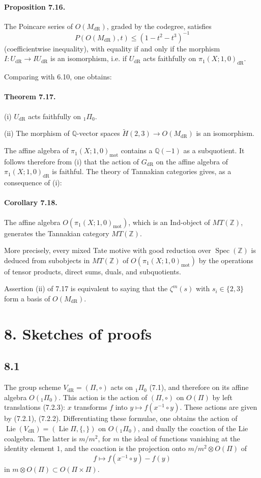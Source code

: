 \documentclass[11pt]{article}
\newcommand{\Q}{\mathbb Q}
\newcommand{\Z}{\mathbb Z}
\newcommand{\Spec}{\operatorname{Spec}}
\newcommand{\Lie}{\operatorname{Lie}}
\newcommand{\dR}{\mathrm{dR}}
\newcommand{\mot}{\mathrm{mot}}
\begin{document}
\paragraph{Proposition 7.16.}
The Poincare series of $O(M_{\dR})$, graded by the codegree, satisfies
\begin{equation}
 P(O(M_{\dR}),t)\leq(1-t^2-t^3)^{-1}
\tag{7.16.1}
\end{equation}
(coefficientwise inequality), with equality if and only if the morphism $I:U_{\dR}\to IU_{\dR}$ is an isomorphism, i.e. if $U_{\dR}$ acts faithfully on $\pi_1(X;1,0)_{\dR}$.

Comparing with 6.10, one obtains:

\paragraph{Theorem 7.17.}
(i) $U_{\dR}$ acts faithfully on ${}_1\Pi_0$.

(ii) The morphism of $\Q$-vector spaces $\widetilde H(2,3)\to O(M_{\dR})$ is an isomorphism.

The affine algebra of $\pi_1(X;1,0)_{\mot}$ contains a $\Q(-1)$ as a subquotient.
It follows therefore from (i) that the action of $G_{\dR}$ on the affine algebra of $\pi_1(X;1,0)_{\dR}$ is faithful.
The theory of Tannakian categories gives, as a consequence of (i):

\paragraph{Corollary 7.18.}
The affine algebra $O(\pi_1(X;1,0)_{\mot})$, which is an Ind-object of $MT(\Z)$, generates the Tannakian category $MT(\Z)$.

More precisely, every mixed Tate motive with good reduction over $\Spec(\Z)$ is deduced from subobjects in $MT(\Z)$ of $O(\pi_1(X;1,0)_{\mot})$ by the operations of tensor products, direct sums, duals, and subquotients.

Assertion (ii) of 7.17 is equivalent to saying that the $\zeta^m(s)$ with $s_i\in\{2,3\}$ form a basis of $O(M_{\dR})$.

\section*{8. Sketches of proofs}

\subsection*{8.1}
The group scheme $V_{\dR}=(\Pi,\circ)$ acts on ${}_1\Pi_0$ (7.1), and therefore on its affine algebra $O({}_1\Pi_0)$.
This action is the action of $(\Pi,\circ)$ on $O(\Pi)$ by left translations (7.2.3): $x$ transforms $f$ into $y\mapsto f(x^{-1}\circ y)$.
These actions are given by (7.2.1), (7.2.2).
Differentiating these formulae, one obtains the action of $\Lie(V_{\dR})=(\Lie\Pi,\{,\})$ on $O({}_1\Pi_0)$, and dually the coaction of the Lie coalgebra.
The latter is $m/m^2$, for $m$ the ideal of functions vanishing at the identity element $1$, and the coaction is the projection onto $m/m^2\otimes O(\Pi)$ of
\[
 f\longmapsto f(x^{-1}\circ y)-f(y)
\]
in $m\otimes O(\Pi)\subset O(\Pi\times\Pi)$.
\end{document}
